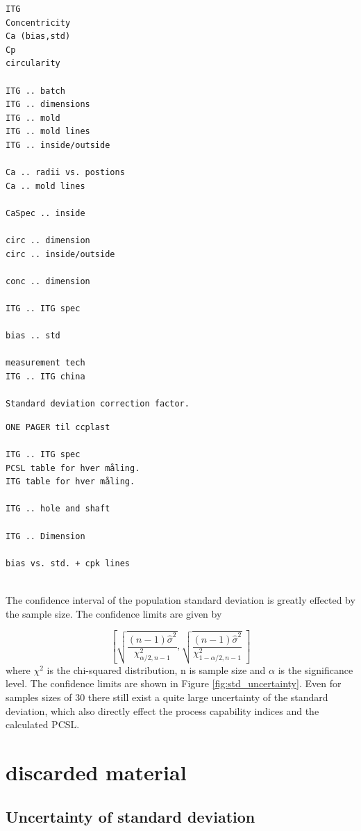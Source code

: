 \documentclass[aip,amsmath, reprint, author-year,nobalancelastpage]{revtex4-1}
\begin{document}
\begin{verbatim}
ITG
Concentricity
Ca (bias,std)
Cp
circularity

ITG .. batch
ITG .. dimensions
ITG .. mold
ITG .. mold lines
ITG .. inside/outside

Ca .. radii vs. postions
Ca .. mold lines
 
CaSpec .. inside

circ .. dimension
circ .. inside/outside

conc .. dimension

ITG .. ITG spec

bias .. std

measurement tech
ITG .. ITG china

Standard deviation correction factor.
\end{verbatim}


\begin{verbatim}
ONE PAGER til ccplast

ITG .. ITG spec 
PCSL table for hver måling.
ITG table for hver måling.

ITG .. hole and shaft

ITG .. Dimension

bias vs. std. + cpk lines


\end{verbatim}





The confidence interval of the population standard deviation is greatly effected by the sample size.  The confidence limits are given by

\begin{equation}
\left[ \sqrt{\frac{(n-1) \hat{\sigma}^2 }{\chi^2_{\alpha/2,n-1}}},  \sqrt{\frac{(n-1) \hat{\sigma}^2 }{\chi^2_{1-\alpha/2,n-1}}} \  \right]
\end{equation}
where $\chi^2$ is the chi-squared distribution, n is sample size and $\alpha$ is the significance level. The confidence limits are shown in Figure \ref{fig:std_uncertainty}. Even for samples sizes of 30 there still exist a quite large uncertainty of the standard deviation, which also directly effect the process capability indices and the calculated PCSL. 


\section{discarded material }

\newpage
\subsection{Uncertainty of standard deviation}
\end{document}
